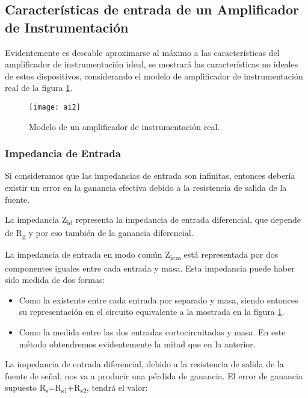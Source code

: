 \subsection{Características de entrada de un Amplificador de Instrumentación} %
\label{sec:caract_entrada_amplificadores}
Evidentemente es deseable aproximarse al máximo a las características del amplificador de instrumentación ideal, se mostrará las características no ideales de estos dispositivos, considerando el modelo de amplificador de instrumentación real de la figura \ref{fig:aireal}.

\begin{figure}[h]
  \centering
  \texttt{[image: ai2]}
  \caption{Modelo de un amplificador de instrumentación real.}\label{fig:aireal}
\end{figure}

\subsubsection{Impedancia de Entrada} %
\label{impedancia_entrada}
Si consideramos que las impedancias de entrada son infinitas, entonces debería existir un error en la ganancia efectiva debido a la resistencia de salida de la fuente.

La impedancia Z\textsubscript{id} representa la impedancia de entrada diferencial, que depende de R\textsubscript{g} y por eso también de la ganancia diferencial.

La impedancia de entrada en modo común Z\textsubscript{icm} está representada por dos componentes iguales entre cada entrada y masa. Esta impedancia puede haber sido medida de dos formas:

\begin{itemize}
\item Como la existente entre cada entrada por separado y masa, siendo entonces su representación en el circuito equivalente a la mostrada en la figura \ref{fig:aireal}.
\item Como la medida entre las dos entradas cortocircuitadas y masa. En este método obtendremos evidentemente la mitad que en la anterior.
\end{itemize}

La impedancia de entrada diferencial, debido a la resistencia de salida de la fuente de señal, nos va a producir una pérdida de ganancia. El error de ganancia supuesto R\textsubscript{s}=R\textsubscript{s1}+R\textsubscript{s2}, tendrá el valor:

